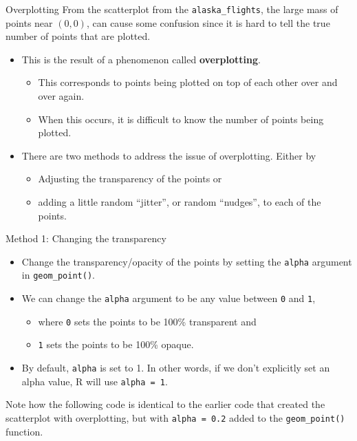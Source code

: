 \documentclass[
  ignorenonframetext,
]{beamer}
\providecommand{\tightlist}{%
  \setlength{\itemsep}{0pt}\setlength{\parskip}{0pt}}
\begin{document}
\begin{frame}[fragile]{Overplotting}
\label{overplotting}
From the scatterplot from the \texttt{alaska\_flights}, the large mass
of points near \((0, 0)\), can cause some confusion since it is hard to
tell the true number of points that are plotted.

\begin{itemize}
\item
  This is the result of a phenomenon called \textbf{overplotting}.

  \begin{itemize}
  \tightlist
  \item
    This corresponds to points being plotted on top of each other over
    and over again.
  \item
    When this occurs, it is difficult to know the number of points being
    plotted.
  \end{itemize}
\item
  There are two methods to address the issue of overplotting. Either by

  \begin{itemize}
  \tightlist
  \item
    Adjusting the transparency of the points or
  \item
    adding a little random ``jitter'', or random ``nudges'', to each of
    the points.
  \end{itemize}
\end{itemize}
\end{frame}

\begin{frame}[fragile]{Method 1: Changing the transparency}
\label{method-1-changing-the-transparency}
\begin{itemize}
\item
  Change the transparency/opacity of the points by setting the
  \texttt{alpha} argument in \texttt{geom\_point()}.
\item
  We can change the \texttt{alpha} argument to be any value between
  \texttt{0} and \texttt{1},

  \begin{itemize}
  \tightlist
  \item
    where \texttt{0} sets the points to be 100\% transparent and
  \item
    \texttt{1} sets the points to be 100\% opaque.
  \end{itemize}
\item
  By default, \texttt{alpha} is set to 1. In other words, if we don't
  explicitly set an alpha value, R will use \texttt{alpha\ =\ 1}.
\end{itemize}

Note how the following code is identical to the earlier code that
created the scatterplot with overplotting, but with
\texttt{alpha\ =\ 0.2} added to the \texttt{geom\_point()} function.
\end{frame}
\end{document}
